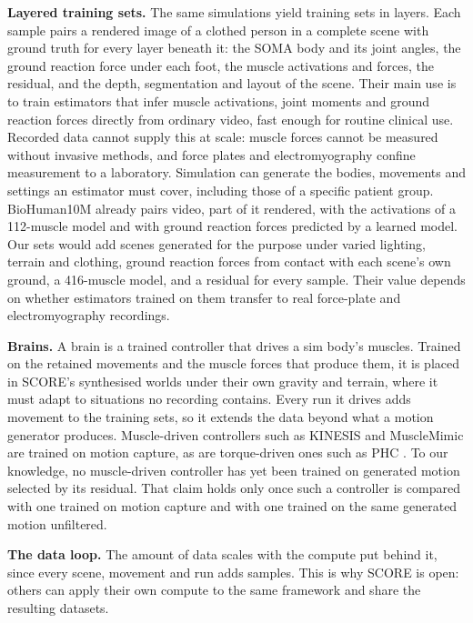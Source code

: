\textbf{Layered training sets.} The same simulations yield training sets in layers. Each sample pairs a rendered image of a clothed person in a complete scene with ground truth for every layer beneath it: the SOMA body and its joint angles, the ground reaction force under each foot, the muscle activations and forces, the residual, and the depth, segmentation and layout of the scene. Their main use is to train estimators that infer muscle activations, joint moments and ground reaction forces directly from ordinary video, fast enough for routine clinical use. Recorded data cannot supply this at scale: muscle forces cannot be measured without invasive methods, and force plates and electromyography confine measurement to a laboratory. Simulation can generate the bodies, movements and settings an estimator must cover, including those of a specific patient group. BioHuman10M \citep{huo2026biohuman} already pairs video, part of it rendered, with the activations of a 112-muscle model and with ground reaction forces predicted by a learned model. Our sets would add scenes generated for the purpose under varied lighting, terrain and clothing, ground reaction forces from contact with each scene's own ground, a 416-muscle model, and a residual for every sample. Their value depends on whether estimators trained on them transfer to real force-plate and electromyography recordings.

\textbf{Brains.} A brain is a trained controller that drives a sim body's muscles. Trained on the retained movements and the muscle forces that produce them, it is placed in SCORE's synthesised worlds under their own gravity and terrain, where it must adapt to situations no recording contains. Every run it drives adds movement to the training sets, so it extends the data beyond what a motion generator produces. Muscle-driven controllers such as KINESIS \citep{simos2025kinesis} and MuscleMimic \citep{li2026musclemimic} are trained on motion capture, as are torque-driven ones such as PHC \citep{luo2023phc}. To our knowledge, no muscle-driven controller has yet been trained on generated motion selected by its residual. That claim holds only once such a controller is compared with one trained on motion capture and with one trained on the same generated motion unfiltered.

\textbf{The data loop.} The amount of data scales with the compute put behind it, since every scene, movement and run adds samples. This is why SCORE is open: others can apply their own compute to the same framework and share the resulting datasets.
